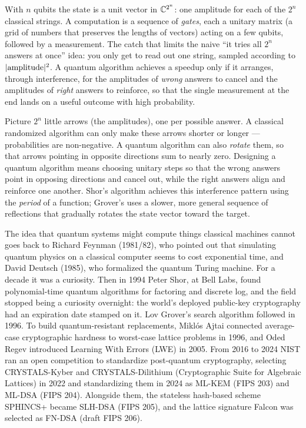 With $n$ qubits the state is a unit vector in $\mathbb{C}^{2^n}$: one amplitude for each of the $2^n$ classical strings. A computation is a sequence of \emph{gates}, each a unitary matrix (a grid of numbers that preserves the lengths of vectors) acting on a few qubits, followed by a measurement. The catch that limits the naive ``it tries all $2^n$ answers at once'' idea: you only get to read out one string, sampled according to $\lvert\text{amplitude}\rvert^2$. A quantum algorithm achieves a speedup only if it arranges, through interference, for the amplitudes of \emph{wrong} answers to cancel and the amplitudes of \emph{right} answers to reinforce, so that the single measurement at the end lands on a useful outcome with high probability.

\begin{intuitionbox}
Picture $2^n$ little arrows (the amplitudes), one per possible answer. A classical randomized algorithm can only make these arrows shorter or longer --- probabilities are non-negative. A quantum algorithm can also \emph{rotate} them, so that arrows pointing in opposite directions sum to nearly zero. Designing a quantum algorithm means choosing unitary steps so that the wrong answers point in opposing directions and cancel out, while the right answers align and reinforce one another. Shor's algorithm achieves this interference pattern using the \emph{period} of a function; Grover's uses a slower, more general sequence of reflections that gradually rotates the state vector toward the target.
\end{intuitionbox}

\begin{historybox}
The idea that quantum systems might compute things classical machines cannot goes back to Richard Feynman (1981/82), who pointed out that simulating quantum physics on a classical computer seems to cost exponential time, and David Deutsch (1985), who formalized the quantum Turing machine. For a decade it was a curiosity. Then in 1994 Peter Shor, at Bell Labs, found polynomial-time quantum algorithms for factoring and discrete log, and the field stopped being a curiosity overnight: the world's deployed public-key cryptography had an expiration date stamped on it. Lov Grover's search algorithm followed in 1996. To build quantum-resistant replacements, Mikl{\'o}s Ajtai connected average-case cryptographic hardness to worst-case lattice problems in 1996, and Oded Regev introduced Learning With Errors (LWE) in 2005. From 2016 to 2024 NIST ran an open competition to standardize post-quantum cryptography, selecting CRYSTALS-Kyber and CRYSTALS-Dilithium (Cryptographic Suite for Algebraic Lattices) in 2022 and standardizing them in 2024 as ML-KEM (FIPS 203) and ML-DSA (FIPS 204). Alongside them, the stateless hash-based scheme SPHINCS+ became SLH-DSA (FIPS 205), and the lattice signature Falcon was selected as FN-DSA (draft FIPS 206).
\end{historybox}

